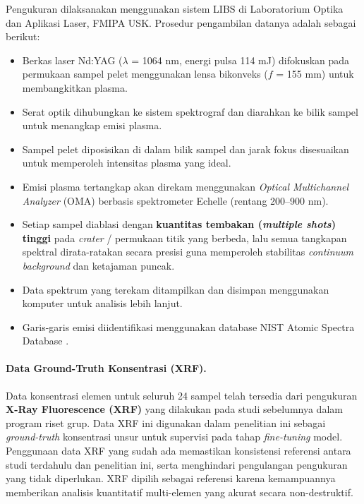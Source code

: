 \documentclass[12pt, a4paper]{article}
\begin{document}
Pengukuran dilaksanakan menggunakan sistem LIBS di Laboratorium Optika dan Aplikasi Laser, FMIPA USK. Prosedur pengambilan datanya adalah sebagai berikut:
\begin{itemize}[leftmargin=2cm]
    \item Berkas laser Nd:YAG ($\lambda$ = 1064 nm, energi pulsa 114 mJ) difokuskan pada permukaan sampel pelet menggunakan lensa bikonveks ($f$ = 155 mm) untuk membangkitkan plasma.
    \item Serat optik dihubungkan ke sistem spektrograf dan diarahkan ke bilik sampel untuk menangkap emisi plasma.
    \item Sampel pelet diposisikan di dalam bilik sampel dan jarak fokus disesuaikan untuk memperoleh intensitas plasma yang ideal.
    \item Emisi plasma tertangkap akan direkam menggunakan \textit{Optical Multichannel Analyzer} (OMA) berbasis spektrometer Echelle (rentang 200--900 nm).
    \item Setiap sampel diablasi dengan \textbf{kuantitas tembakan (\textit{multiple shots}) tinggi} pada \textit{crater} / permukaan titik yang berbeda, lalu semua tangkapan spektral dirata-ratakan secara presisi guna memperoleh stabilitas \textit{continuum} \textit{background} dan ketajaman puncak.
    \item Data spektrum yang terekam ditampilkan dan disimpan menggunakan komputer untuk analisis lebih lanjut.
    \item Garis-garis emisi diidentifikasi menggunakan database NIST Atomic Spectra Database \citep{kramida2024}.
\end{itemize}


\paragraph{Data Ground-Truth Konsentrasi (XRF).}
Data konsentrasi elemen untuk seluruh 24 sampel telah tersedia dari pengukuran \textbf{X-Ray Fluorescence (XRF)} yang dilakukan pada studi sebelumnya dalam program riset grup. Data XRF ini digunakan dalam penelitian ini sebagai \textit{ground-truth} konsentrasi unsur untuk supervisi pada tahap \textit{fine-tuning} model. Penggunaan data XRF yang sudah ada memastikan konsistensi referensi antara studi terdahulu dan penelitian ini, serta menghindari pengulangan pengukuran yang tidak diperlukan. XRF dipilih sebagai referensi karena kemampuannya memberikan analisis kuantitatif multi-elemen yang akurat secara non-destruktif.


\end{document}
